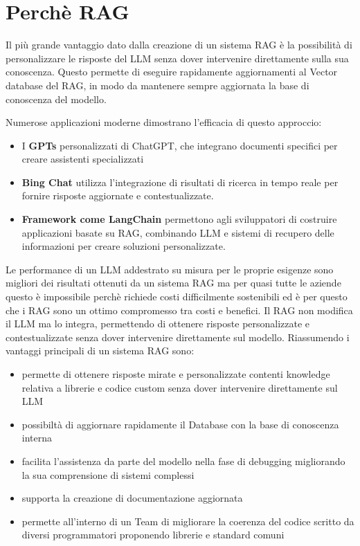 \documentclass[12pt,a4paper,openright,twoside]{book}
\begin{document}
\section{Perchè RAG}
Il più grande vantaggio dato dalla creazione di un sistema RAG è la possibilità di personalizzare le risposte del \ac{LLM} senza dover intervenire direttamente sulla sua conoscenza.
Questo permette di eseguire rapidamente aggiornamenti al Vector database del \ac{RAG}, in modo da mantenere sempre aggiornata la base di conoscenza del modello.

Numerose applicazioni moderne dimostrano l'efficacia di questo approccio:
\begin{itemize}
    \item I \textbf{GPTs} personalizzati di ChatGPT, che integrano documenti specifici per creare assistenti specializzati
    \item \textbf{Bing Chat} utilizza l'integrazione di risultati di ricerca in tempo reale per fornire risposte aggiornate e contestualizzate.
    \item \textbf{Framework come LangChain} permettono agli sviluppatori di costruire applicazioni basate su RAG, combinando LLM e sistemi di recupero delle informazioni per creare soluzioni personalizzate.
\end{itemize}
Le performance di un LLM addestrato su misura per le proprie esigenze sono migliori dei risultati ottenuti da un sistema RAG ma per quasi
tutte le aziende questo è impossibile perchè richiede costi difficilmente sostenibili ed è per questo che i RAG sono un ottimo compromesso tra costi e benefici.
Il \ac{RAG} non modifica il LLM ma lo integra, permettendo di ottenere risposte personalizzate e contestualizzate senza dover intervenire direttamente sul modello.
Riassumendo i vantaggi principali di un sistema RAG sono:
\begin{itemize}
    \item permette di ottenere risposte mirate e personalizzate contenti knowledge relativa a librerie e codice custom senza dover intervenire direttamente sul \ac{LLM}
    \item possibiltà di aggiornare rapidamente il Database con la base di conoscenza interna
    \item facilita l'assistenza da parte del modello nella fase di debugging migliorando la sua comprensione di sistemi complessi
    \item supporta la creazione di documentazione aggiornata
    \item permette all'interno di un Team di migliorare la coerenza del codice scritto da diversi programmatori proponendo librerie e standard comuni
\end{itemize}
\end{document}
